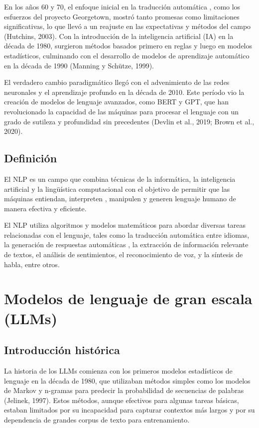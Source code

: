 En los años 60 y 70, el enfoque inicial en la traducción automática
, como los esfuerzos del proyecto Georgetown, mostró tanto promesas como limitaciones significativas, lo que llevó a un
reajuste en las expectativas y métodos del campo (Hutchins, 2003).
Con la introducción de la inteligencia artificial (IA) en la década de 1980, surgieron métodos basados primero en reglas
y luego en modelos
estadísticos, culminando con el desarrollo de modelos de aprendizaje automático en la década de 1990 (Manning y Schütze,
1999).

El verdadero cambio paradigmático llegó con el advenimiento de las redes neuronales y el aprendizaje profundo
en la década de 2010.
Este período vio la creación de modelos de lenguaje avanzados, como BERT y GPT, que han revolucionado la capacidad de
las máquinas para procesar el lenguaje con un grado de sutileza y profundidad sin precedentes (Devlin et al., 2019;
Brown et al., 2020).

\subsection{Definición}
El NLP es un campo que combina técnicas de la informática, la inteligencia artificial y la lingüística computacional con
el objetivo de permitir que las máquinas entiendan, interpreten
, manipulen y generen lenguaje humano de manera efectiva y eficiente.

El NLP utiliza algoritmos y modelos matemáticos para abordar diversas tareas relacionadas con el lenguaje, tales como la
traducción automática entre idiomas, la generación de respuestas automáticas
, la extracción de información relevante de textos, el análisis de sentimientos, el reconocimiento de voz, y
la síntesis de habla, entre otros.


\section{Modelos de lenguaje de gran escala (LLMs)}

\subsection{Introducción histórica}
La historia de los LLMs comienza con los primeros modelos estadísticos de lenguaje en
la década de 1980, que utilizaban métodos simples como los modelos de Markov y n-gramas para predecir la probabilidad
de secuencias de palabras (Jelinek, 1997).
Estos métodos, aunque efectivos para algunas tareas básicas, estaban limitados por su incapacidad para capturar
contextos
más largos y por su dependencia de grandes corpus de texto para entrenamiento.

